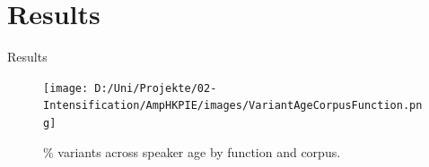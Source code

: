 \documentclass[12pt, table]{beamer}
\newcommand{\cmark}{\ding{51}}%
\begin{document}

\section{Results}
\begin{frame}
\begin{center}
\begin{large}
\end{large}
\end{center}
\end{frame}

\begin{frame}
Results
\begin{figure}[!htb]
\centering
\texttt{[image: D:/Uni/Projekte/02-Intensification/AmpHKPIE/images/VariantAgeCorpusFunction.png]}
\caption{\tiny \% variants across speaker age by function and corpus.}
\label{fig:VariantAgeFunctionCorpus}
\end{figure} 
\end{frame} 
\end{document}
